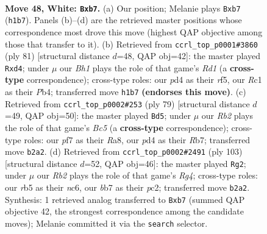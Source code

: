 \documentclass[11pt]{article}
\begin{document}
\clearpage

\begin{figure}[p]\centering
\begin{subfigure}{0.46\textwidth}\centering
\resizebox{\linewidth}{!}{%
\newchessgame
\chessboard[
  setfen={3r1k2/1b3p1p/8/pr6/3p2P1/1P5N/1R1K3P/2R4B w - - 10 48},
  showmover=false,
  pgfstyle=straightmove, color=movearrow, markmove={h1-b7}
]}
\caption{}
\end{subfigure}\hfill
\begin{subfigure}{0.46\textwidth}\centering
\resizebox{\linewidth}{!}{%
\newchessgame
\chessboard[
  setfen={3rr1k1/7p/8/5R2/Pp1B4/4pP2/6P1/4R1K1 b - - 0 41},
  showmover=false,
  pgfstyle=straightmove, color=movearrow, markmove={d8-d4}
]}
\caption{}
\end{subfigure}
\\[4pt]
\begin{subfigure}{0.46\textwidth}\centering
\resizebox{\linewidth}{!}{%
\newchessgame
\chessboard[
  setfen={r5k1/1rb3p1/5P1p/5B2/p1b5/7P/6PB/R3R2K b - - 0 40},
  showmover=false,
  pgfstyle=straightmove, color=movearrow, markmove={c4-d5}
]}
\caption{}
\end{subfigure}\hfill
\begin{subfigure}{0.46\textwidth}\centering
\resizebox{\linewidth}{!}{%
\newchessgame
\chessboard[
  setfen={8/5pk1/2N2r2/2R1pbr1/P6R/4P3/2P5/4K3 b - - 6 52},
  showmover=false,
  pgfstyle=straightmove, color=movearrow, markmove={g5-g2}
]}
\caption{}
\end{subfigure}
\caption{\textbf{Move 48, White: \texttt{Bxb7}.} (a) Our position; Melanie plays \texttt{Bxb7} (\texttt{h1b7}). Panels (b)--(d) are the retrieved master positions whose correspondence most drove this move (highest QAP objective among those that transfer to it). (b) Retrieved from \texttt{ccrl\_top\_p0001\#3860} (ply 81) [structural distance $d$=48, QAP obj=42]: the master played \texttt{Rxd4}; under $\mu$ our \emph{Bh1} plays the role of that game's \emph{Rd1} (a \textbf{cross-type} correspondence); cross-type roles: our \emph{p}d4 as their \emph{r}f5, our \emph{R}c1 as their \emph{P}b4; transferred move \texttt{h1b7} \textbf{(endorses this move)}. (c) Retrieved from \texttt{ccrl\_top\_p0002\#253} (ply 79) [structural distance $d$=49, QAP obj=50]: the master played \texttt{Bd5}; under $\mu$ our \emph{Rb2} plays the role of that game's \emph{Bc5} (a \textbf{cross-type} correspondence); cross-type roles: our \emph{p}f7 as their \emph{R}a8, our \emph{p}d4 as their \emph{R}b7; transferred move \texttt{b2a2}. (d) Retrieved from \texttt{ccrl\_top\_p0002\#2491} (ply 103) [structural distance $d$=52, QAP obj=46]: the master played \texttt{Rg2}; under $\mu$ our \emph{Rb2} plays the role of that game's \emph{Rg4}; cross-type roles: our \emph{r}b5 as their \emph{n}c6, our \emph{b}b7 as their \emph{p}c2; transferred move \texttt{b2a2}. Synthesis: 1 retrieved analog transferred to \texttt{Bxb7} (summed QAP objective 42, the strongest correspondence among the candidate moves); Melanie committed it via the \texttt{search} selector.}
\label{fig:thought-m94}
\end{figure}
\end{document}
